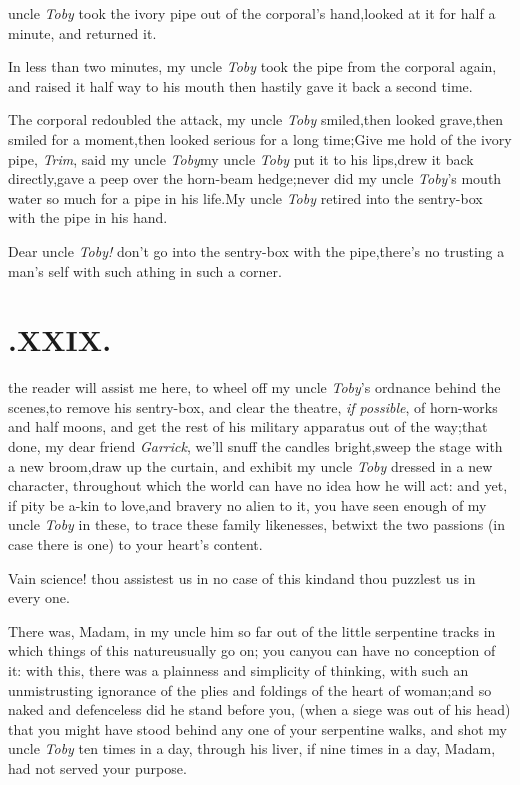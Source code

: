 \documentclass{article}
\begin{document}
 uncle \textit{Toby} took the ivory
pipe out of the corporal’s hand,\tsk looked at it for half
a minute, and returned it.

In less than two minutes, my uncle \textit{Toby} took the pipe
from the corporal again, and raised it half way to his
mouth\break
\tsh then hastily gave it back a second time.

The corporal redoubled the attack,\break
\tsh my uncle \textit{Toby} smiled,\tsh then looked
grave,\tsh then smiled for a moment,\tsh then
looked serious for a long time;\tsh Give me hold of the
ivory pipe, \textit{Trim}, said my uncle \textit{Toby}\tsh my
uncle \textit{Toby} put it to his lips,\tsh drew it back
directly,\tsh gave a peep over the horn-beam
hedge;\tsh never did my uncle \textit{Toby}’s mouth
water so much for a pipe in his life.\tsh My uncle
\textit{Toby} retired into the sentry-box with the pipe\break
in his hand.\tsh

\tsh Dear uncle \textit{Toby!} don’t go into the
sentry-box with the pipe,\tsk there’s no trusting a
man’s self with such a\break thing in such a corner.

\etpp
\section{.\enspace XXIX.}

 the reader will assist me here, to\break
wheel off my uncle \textit{Toby}’s ordnance behind the
scenes,\tsh to remove his sentry-box, and clear the
theatre, \textit{if possible}, of horn-works and half moons, and get the
rest of his military appa\-ratus out of the way;\tsh that
done, my dear friend \textit{Garrick}, we’ll snuff the candles
bright,\tsk sweep the stage with a new broom,\tsk draw up the
curtain, and exhibit my uncle \textit{Toby} dressed in a new
character, throughout which the world can have no idea how he will
act: and yet, if pity be a-kin to love,\tsk and bravery no alien
to it, you have seen enough of my uncle \textit{Toby} in these, to
trace these family likenesses, betwixt the two passions (in case
there is one) to your heart’s content.

Vain science! thou assistest us in no case of this
kind\tsk and thou puzzlest us in every one.

There was, Madam, in my uncle\break 
{}
him so far out of the little serpentine tracks in
which things of this nature\break usually go on; you can\tsk you can
have no conception of it: with this, there was a plainness and
simplicity of thinking, with such an unmistrusting ignorance of the
plies and foldings of the heart of woman;\tsh and so naked
and defenceless did he stand before you, (when a siege was out of
his head) that you might have stood behind any one of your
serpentine walks, and shot my uncle \textit{Toby} ten times in a day,
through his liver, if nine times in a day, Madam, had not served
your purpose.
\end{document}

